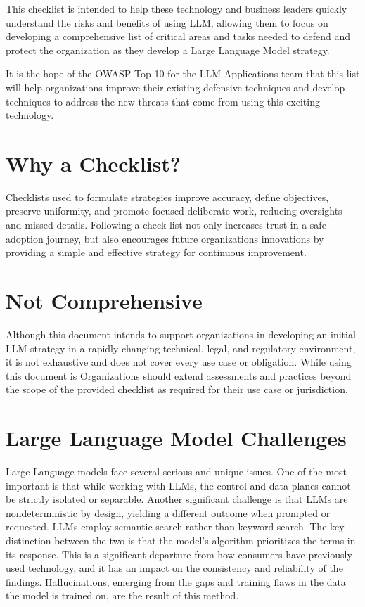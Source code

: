 This checklist is intended to help these technology and business leaders quickly understand the risks and benefits of using LLM, allowing them to focus on developing a comprehensive list of critical areas and tasks needed to defend and protect the organization as they develop a Large Language Model strategy.

It is the hope of the OWASP Top 10 for the LLM Applications team that this list will help organizations improve their existing defensive techniques and develop techniques to address the new threats that come from using this exciting technology.

\section{Why a Checklist?}
Checklists used to formulate strategies improve accuracy, define objectives, preserve uniformity, and promote focused deliberate work, reducing oversights and missed details. Following a check list not only increases trust in a safe adoption journey, but also encourages future organizations innovations by providing a simple and effective strategy for continuous improvement.

\section{Not Comprehensive}
Although this document intends to support organizations in developing an initial LLM strategy in a rapidly changing technical, legal, and regulatory environment, it is not exhaustive and does not cover every use case or obligation. While using this document is Organizations should extend assessments and practices beyond the scope of the provided checklist as required for their use case or jurisdiction.

\section{Large Language Model Challenges}
Large Language models face several serious and unique issues. One of the most important is that while working with LLMs, the control and data planes cannot be strictly isolated or separable. Another significant challenge is that LLMs are nondeterministic by design, yielding a different outcome when prompted or requested. LLMs employ semantic search rather than keyword search. The key distinction between the two is that the model's algorithm prioritizes the terms in its response. This is a significant departure from how consumers have previously used technology, and it has an impact on the consistency and reliability of the findings. Hallucinations, emerging from the gaps and training flaws in the data the model is trained on, are the result of this method.

